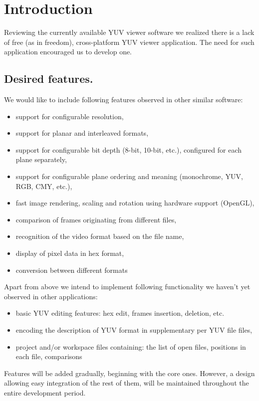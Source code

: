 \chapter{Introduction}
\label{chap:Introduction}

Reviewing the currently available YUV viewer software we realized there is a lack of free (as in freedom), cross-platform YUV viewer application. The need for such application encouraged us to develop one.

\section{Desired features.}

We would like to include following features observed in other similar software:
\begin{itemize}
  \item{} support for configurable resolution,
  \item{} support for planar and interleaved formats,
  \item{} support for configurable bit depth (8-bit, 10-bit, etc.), configured for each plane separately,
  \item{} support for configurable plane ordering and meaning (monochrome, YUV, RGB, CMY, etc.),
  \item{} fast image rendering, scaling and rotation using hardware support (OpenGL),
  \item{} comparison of frames originating from different files,
  \item{} recognition of the video format based on the file name,
  \item{} display of pixel data in hex format,
  \item{} conversion between different formats
\end{itemize}

Apart from above we intend to implement following functionality we haven't yet observed in other applications:
\begin{itemize}
  \item{} basic YUV editing features: hex edit, frames insertion, deletion, etc.
  \item{} encoding the description of YUV format in supplementary per YUV file files,
  \item{} project and/or workspace files containing: the list of open files, positions in each file, comparisons
\end{itemize}


Features will be added gradually, beginning with the core ones. However, a design allowing easy integration of the rest of them, will be maintained throughout the entire development period.
